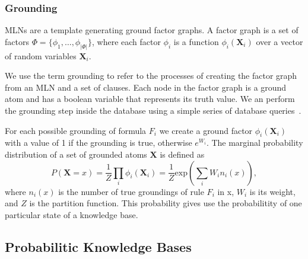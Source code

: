 \subsubsection{Grounding}

MLNs are a template generating ground factor graphs.
A factor graph is a set of factors \(\Phi = \{ \phi_1, \ldots, \phi_{|\Phi|} \} \),
where each factor \(\phi_i\) is a function \(\phi_i (\mathbf{X}_i)\) over a
vector of random variables \(\mathbf{X}_i\).

We use the term grounding to refer to the processes of creating the factor graph from an
MLN and a set of clauses.
Each node in the factor graph is a ground atom and has a boolean variable that represents its truth value.
We an perform the grounding step inside the database using a simple series of database queries~\cite{chen2014knowledge}.

For each possible grounding of formula \(F_i\) we create a ground factor
\(\phi_i(\mathbf{X}_i)\) with a value of 1 if the grounding is true, otherwise
\(e^{W_i}\). The marginal probability distribution of a set of grounded atoms \(\mathbf{X}\) is defined as
\begin{equation}
\label{eq:probqa-marginal}
P(\mathbf{X} = x) = \frac{1}{Z} \prod_i \phi_i (\mathbf{X}_i) = \frac{1}{Z} \text{exp} \left( \sum_i W_i n_i(x) \right),
\end{equation}
where \(n_i(x)\) is the number of true groundings of rule \(F_i\) in x, \(W_i\) is its weight, and \(Z\) is the partition function.
This probability gives use the probabilitity of one particular state of a knowledge base.







\subsection{Probabilitic Knowledge Bases}


